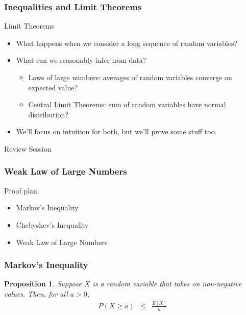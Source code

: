 \documentclass{beamer}
\newtheorem{prop}{Proposition}
\numberwithin{equation}{section}
\begin{document}
\begin{frame}
\frametitle{Inequalities and Limit Theorems}


\alert{Limit Theorems}
\begin{itemize}
\item[-] What happens when we consider a long sequence of random variables?
\item[-] What can we reasonably infer from data?
\begin{itemize}
\item[-] Laws of large numbers: averages of random variables converge on expected value?
\item[-] Central Limit Theorems: sum of random variables have normal distribution?
\end{itemize}
\item[-] We'll focus on intuition for both, but we'll prove some stuff too.  
\end{itemize}

\alert{Review Session}


\end{frame}


\begin{frame}
\frametitle{Weak Law of Large Numbers}

Proof plan: 
\begin{itemize}
\item[-] Markov's Inequality
\item[-] Chebyshev's Inequality
\item[-] Weak Law of Large Numbers 
\end{itemize}


\end{frame}



\begin{frame}
\frametitle{Markov's Inequality}

\begin{prop}
Suppose $X$ is a random variable that takes on non-negative values.  Then, for all $a>0$, 
\begin{eqnarray}
P(X\geq a) & \leq & \frac{E[X]}{a} \nonumber 
\end{eqnarray}
\end{prop}

\end{frame}
\end{document}
